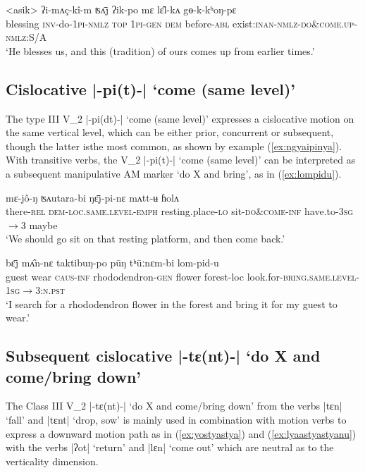 \documentclass[oneside,a4paper,11pt]{article}
\newcommand{\ipa}[1]{{\phon#1}}
\newcommand{\dhatu}[2]{|\ipa{#1}| `#2'}
\begin{document}
\begin{exe}
\ex \label{ex:gyokkhongpya}
 \gll <asik> \ipa{ʔi-mʌç-kî-m} \ipa{ʦʌ̄j} \ipa{ʔik-po} \ipa{mɛ} \ipa{lɛ̂l-kʌ} \ipa{gɵ-k-kʰoŋ-pɛ} \\
blessing \textsc{inv}-do-\textsc{1pi}-\textsc{nmlz} \textsc{top} \textsc{1pi}-\textsc{gen} \textsc{dem} before-\textsc{abl} exist:\textsc{inan}-\textsc{nmlz}-\textsc{do\&come.up}-\textsc{nmlz}:S/A \\
\glt   `He blesses us, and this (tradition) of ours comes up from earlier times.'
\end{exe}

 

\subsection{Cislocative \dhatu{-pi(t)-}{come (same level)}} \label{sec:v2.pi}
The type III V_2 \dhatu{-pi(dt)-}{come (same level)} expresses a cislocative motion on the same vertical level, which can be either prior, concurrent or subsequent, though the latter isthe most common, as shown by example (\ref{ex:ngyaipinya}). With transitive verbs, the V_2 \dhatu{-pi(t)-}{come (same level)} can be interpreted as a subsequent manipulative AM marker `do X and bring', as in  (\ref{ex:lompidu}).

\begin{exe}
\ex \label{ex:ngyaipinya}
 \gll \ipa{jakâ-m}	\ipa{mɛ-jô-ŋ}	\ipa{ʦʌutara-bi}	\ipa{ŋɛ̄j-pi-nɛ}	\ipa{mʌtt-ʉ}	\ipa{ɦolʌ} \\
 there-\textsc{rel} \textsc{dem-loc.same.level}-\textsc{emph} resting.place-\textsc{lo} sit-\textsc{do\&come}-\textsc{inf} have.to-\textsc{3sg$\rightarrow$3} maybe \\
 \glt `We should go sit on that resting platform, and then come back.'
 \end{exe}
 
\begin{exe}
\ex \label{ex:lompidu}
 \gll \ipa{tsʰɛ̂l}	\ipa{bɛ̄j}	\ipa{mʌ̂n-nɛ}	\ipa{taktibuŋ-po}	\ipa{pūŋ}	\ipa{tʰūːnɛm-bi}	\ipa{lom-pid-u} \\
 guest wear \textsc{caus}-\textsc{inf} rhododendron-\textsc{gen} flower forest-loc look.for-\textsc{bring.same.level}-\textsc{1sg$\rightarrow$3:n.pst} \\
\glt `I search for a rhododendron flower in the forest and bring it for my guest to wear.'
\end{exe}

\subsection{Subsequent cislocative \dhatu{-tɛ(nt)-}{do X and come/bring down}} \label{sec:v2.tya}
The Class III V_2 \dhatu{-tɛ(nt)-}{do X and come/bring down} from the verbs \dhatu{tɛn}{fall} and \dhatu{tɛnt}{drop, sow} is mainly used in combination with motion verbs to express a downward motion path as in (\ref{ex:yostyastya}) and (\ref{ex:lyaastyastyanu}) with the verbs \dhatu{ʔot}{return} and \dhatu{lɛn}{come out} which are neutral as to the verticality dimension.
\end{document}
